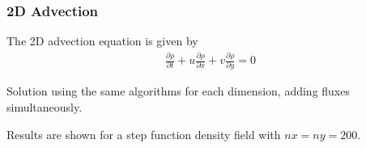 
\begin{frame}
	\frametitle{2D Advection}
	
	The 2D advection equation is given by
	\begin{align*}
		\frac{\partial \rho}{\partial t} + u \frac{\partial \rho}{\partial x} + v \frac{\partial \rho}{\partial y} = 0
	\end{align*}
	
	Solution using the same algorithms for each dimension, adding fluxes simultaneously.
	
	Results are shown for a step function density field with $nx = ny = 200$.
	
\end{frame}